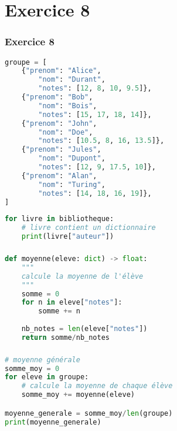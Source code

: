 \documentclass[svgnames,11pt]{beamer}
\begin{document}
\section{Exercice 8}
\begin{frame}[fragile]
    \frametitle{Exercice 8}

\begin{lstlisting}[language=Python , basicstyle=\ttfamily\small, xleftmargin=2em, xrightmargin=2em]
groupe = [
    {"prenom": "Alice",
        "nom": "Durant",
        "notes": [12, 8, 10, 9.5]},
    {"prenom": "Bob",
        "nom": "Bois",
        "notes": [15, 17, 18, 14]},
    {"prenom": "John",
        "nom": "Doe",
        "notes": [10.5, 8, 16, 13.5]},
    {"prenom": "Jules",
        "nom": "Dupont",
        "notes": [12, 9, 17.5, 10]},
    {"prenom": "Alan",
        "nom": "Turing",
        "notes": [14, 18, 16, 19]},
]
\end{lstlisting}

\begin{center}
    \begin{lstlisting}[language=Python , basicstyle=\ttfamily\small, xleftmargin=2em, xrightmargin=2em]
for livre in bibliotheque:
    # livre contient un dictionnaire
    print(livre["auteur"])
\end{lstlisting}
    \label{CODE}
    \end{center}
\end{frame}
\begin{frame}[fragile]
    \frametitle{}

\begin{lstlisting}[language=Python , basicstyle=\ttfamily\small, xleftmargin=2em, xrightmargin=2em]
def moyenne(eleve: dict) -> float:
    """
    calcule la moyenne de l'élève
    """
    somme = 0
    for n in eleve["notes"]:
        somme += n
    
    nb_notes = len(eleve["notes"])
    return somme/nb_notes
\end{lstlisting}

\end{frame}
\begin{frame}[fragile]
    \frametitle{}

\begin{center}
\begin{lstlisting}[language=Python , basicstyle=\ttfamily\small, xleftmargin=2em, xrightmargin=2em]
# moyenne générale
somme_moy = 0
for eleve in groupe:
    # calcule la moyenne de chaque élève
    somme_moy += moyenne(eleve)

moyenne_generale = somme_moy/len(groupe)
print(moyenne_generale)
\end{lstlisting}
\label{CODE}
\end{center}    

\end{frame}
\end{document}
